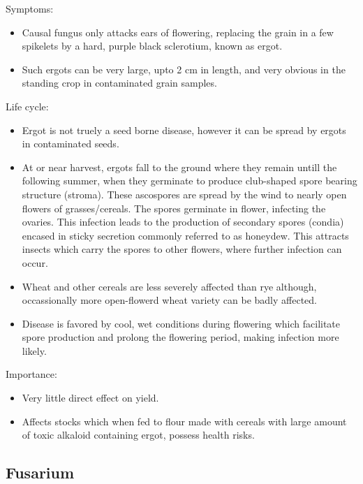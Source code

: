 \documentclass[
  openany]{book}
\providecommand{\tightlist}{%
  \setlength{\itemsep}{0pt}\setlength{\parskip}{0pt}}
\begin{document}
Symptoms:

\begin{itemize}
\tightlist
\item
  Causal fungus only attacks ears of flowering, replacing the grain in a few spikelets by a hard, purple black sclerotium, known as ergot.
\item
  Such ergots can be very large, upto 2 cm in length, and very obvious in the standing crop in contaminated grain samples.
\end{itemize}

Life cycle:

\begin{itemize}
\tightlist
\item
  Ergot is not truely a seed borne disease, however it can be spread by ergots in contaminated seeds.
\item
  At or near harvest, ergots fall to the ground where they remain untill the following summer, when they germinate to produce club-shaped spore bearing structure (stroma). These ascospores are spread by the wind to nearly open flowers of grasses/cereals. The spores germinate in flower, infecting the ovaries. This infection leads to the production of secondary spores (condia) encased in sticky secretion commonly referred to as honeydew. This attracts insects which carry the spores to other flowers, where further infection can occur.
\item
  Wheat and other cereals are less severely affected than rye although, occassionally more open-flowerd wheat variety can be badly affected.
\item
  Disease is favored by cool, wet conditions during flowering which facilitate spore production and prolong the flowering period, making infection more likely.
\end{itemize}

Importance:

\begin{itemize}
\tightlist
\item
  Very little direct effect on yield.
\item
  Affects stocks which when fed to flour made with cereals with large amount of toxic alkaloid containing ergot, possess health risks.
\end{itemize}

\hypertarget{fusarium}{%
\subsection{Fusarium}\label{fusarium}}
\end{document}
